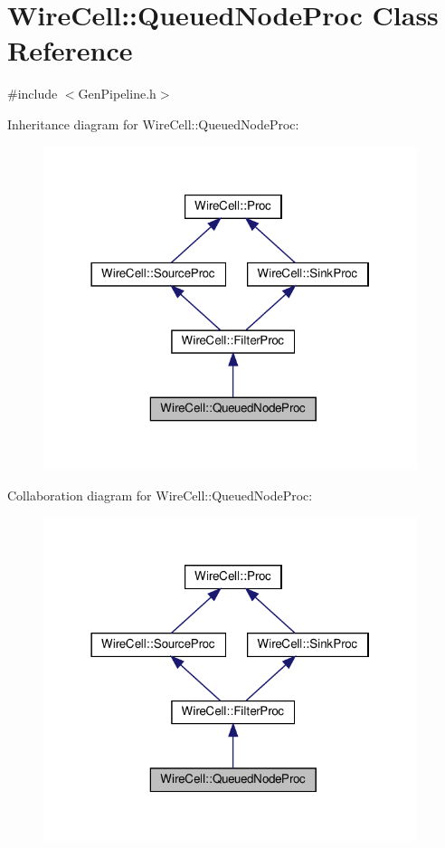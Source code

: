 \hypertarget{class_wire_cell_1_1_queued_node_proc}{}\section{Wire\+Cell\+:\+:Queued\+Node\+Proc Class Reference}
\label{class_wire_cell_1_1_queued_node_proc}


{\ttfamily \#include $<$Gen\+Pipeline.\+h$>$}



Inheritance diagram for Wire\+Cell\+:\+:Queued\+Node\+Proc\+:
\nopagebreak
\begin{figure}[H]
\begin{center}
\leavevmode
\includegraphics[width=310pt]{class_wire_cell_1_1_queued_node_proc__inherit__graph}
\end{center}
\end{figure}


Collaboration diagram for Wire\+Cell\+:\+:Queued\+Node\+Proc\+:
\nopagebreak
\begin{figure}[H]
\begin{center}
\leavevmode
\includegraphics[width=310pt]{class_wire_cell_1_1_queued_node_proc__coll__graph}
\end{center}
\end{figure}
